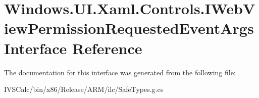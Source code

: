 \hypertarget{interface_windows_1_1_u_i_1_1_xaml_1_1_controls_1_1_i_web_view_permission_requested_event_args}{}\section{Windows.\+U\+I.\+Xaml.\+Controls.\+I\+Web\+View\+Permission\+Requested\+Event\+Args Interface Reference}
\label{interface_windows_1_1_u_i_1_1_xaml_1_1_controls_1_1_i_web_view_permission_requested_event_args}


The documentation for this interface was generated from the following file\+:\begin{DoxyCompactItemize}
\item 
I\+V\+S\+Calc/bin/x86/\+Release/\+A\+R\+M/ilc/Safe\+Types.\+g.\+cs\end{DoxyCompactItemize}
